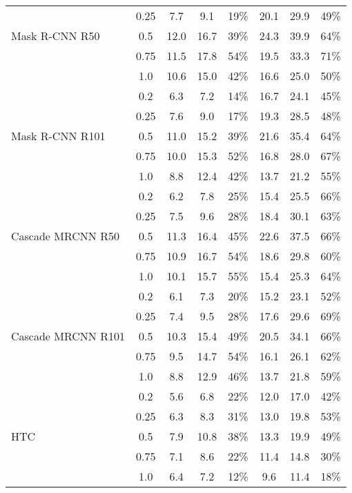 \begin{table*}[]
\begin{tabular}{lccccccc}
                   & 0.25 & 7.7  & 9.1  & 19\% & 20.1 & 29.9 & 49\% \\
Mask R-CNN R50     & 0.5  & 12.0 & 16.7 & 39\% & 24.3 & 39.9 & 64\% \\
                   & 0.75 & 11.5 & 17.8 & 54\% & 19.5 & 33.3 & 71\% \\
                   & 1.0  & 10.6 & 15.0 & 42\% & 16.6 & 25.0 & 50\% \\
\midrule
                   & 0.2  & 6.3  & 7.2  & 14\% & 16.7 & 24.1 & 45\% \\
                   & 0.25 & 7.6  & 9.0  & 17\% & 19.3 & 28.5 & 48\% \\
Mask R-CNN R101    & 0.5  & 11.0 & 15.2 & 39\% & 21.6 & 35.4 & 64\% \\
                   & 0.75 & 10.0 & 15.3 & 52\% & 16.8 & 28.0 & 67\% \\
                   & 1.0  & 8.8  & 12.4 & 42\% & 13.7 & 21.2 & 55\% \\
\midrule
                   & 0.2  & 6.2  & 7.8  & 25\% & 15.4 & 25.5 & 66\% \\
                   & 0.25 & 7.5  & 9.6  & 28\% & 18.4 & 30.1 & 63\% \\
Cascade MRCNN R50  & 0.5  & 11.3 & 16.4 & 45\% & 22.6 & 37.5 & 66\% \\
                   & 0.75 & 10.9 & 16.7 & 54\% & 18.6 & 29.8 & 60\% \\
                   & 1.0  & 10.1 & 15.7 & 55\% & 15.4 & 25.3 & 64\% \\
\midrule
                   & 0.2  & 6.1  & 7.3  & 20\% & 15.2 & 23.1 & 52\% \\
                   & 0.25 & 7.4  & 9.5  & 28\% & 17.6 & 29.6 & 69\% \\
Cascade MRCNN R101 & 0.5  & 10.3 & 15.4 & 49\% & 20.5 & 34.1 & 66\% \\
                   & 0.75 & 9.5  & 14.7 & 54\% & 16.1 & 26.1 & 62\% \\
                   & 1.0  & 8.8  & 12.9 & 46\% & 13.7 & 21.8 & 59\% \\
\midrule
                   & 0.2  & 5.6  & 6.8  & 22\% & 12.0 & 17.0 & 42\% \\
                   & 0.25 & 6.3  & 8.3  & 31\% & 13.0 & 19.8 & 53\% \\
HTC                & 0.5  & 7.9  & 10.8 & 38\% & 13.3 & 19.9 & 49\% \\
                   & 0.75 & 7.1  & 8.6  & 22\% & 11.4 & 14.8 & 30\% \\
                   & 1.0  & 6.4  & 7.2  & 12\% & 9.6  & 11.4 & 18\% \\
\bottomrule
\end{tabular}
\addtolength{\tabcolsep}{-0.2em}
\end{table*}

